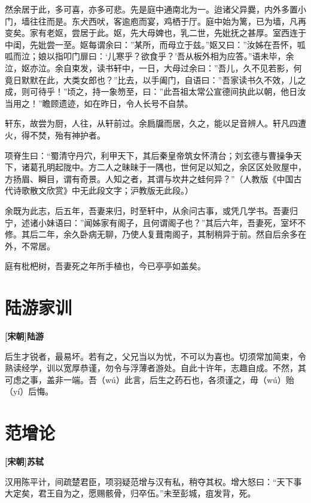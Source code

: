 \documentclass[UTF8,titlepage,oneside]{ctexbook}
\begin{document}
然余居于此，多可喜，亦多可悲。先是庭中通南北为一。迨诸父异爨，内外多置小门，墙往往而是。东犬西吠，客逾庖而宴，鸡栖于厅。庭中始为篱，已为墙，凡再变矣。家有老妪，尝居于此。妪，先大母婢也，乳二世，先妣抚之甚厚。室西连于中闺，先妣尝一至。妪每谓余曰：”某所，而母立于兹。”妪又曰：”汝姊在吾怀，呱呱而泣；娘以指叩门扉曰：‘儿寒乎？欲食乎？’吾从板外相为应答。”语未毕，余泣，妪亦泣。余自束发，读书轩中，一日，大母过余曰：”吾儿，久不见若影，何竟日默默在此，大类女郎也？”比去，以手阖门，自语曰：”吾家读书久不效，儿之成，则可待乎！”顷之，持一象笏至，曰：”此吾祖太常公宣德间执此以朝，他日汝当用之！”瞻顾遗迹，如在昨日，令人长号不自禁。

轩东，故尝为厨，人往，从轩前过。余扃牖而居，久之，能以足音辨人。轩凡四遭火，得不焚，殆有神护者。

项脊生曰：“蜀清守丹穴，利甲天下，其后秦皇帝筑女怀清台；刘玄德与曹操争天下，诸葛孔明起陇中。方二人之昧昧于一隅也，世何足以知之，余区区处败屋中，方扬眉、瞬目，谓有奇景。人知之者，其谓与坎井之蛙何异？”（人教版《中国古代诗歌散文欣赏》中无此段文字；沪教版无此段。）

余既为此志，后五年，吾妻来归，时至轩中，从余问古事，或凭几学书。吾妻归宁，述诸小妹语曰：”闻姊家有阁子，且何谓阁子也？”其后六年，吾妻死，室坏不修。其后二年，余久卧病无聊，乃使人复葺南阁子，其制稍异于前。然自后余多在外，不常居。

庭有枇杷树，吾妻死之年所手植也，今已亭亭如盖矣。


\chapter*{陆游家训}
\begin{center}
	\textbf{[宋朝]陆游}
\end{center}

后生才锐者，最易坏。若有之，父兄当以为忧，不可以为喜也。切须常加简束，令熟读经学，训以宽厚恭谨，勿令与浮薄者游处。自此十许年，志趣自成。不然，其可虑之事，盖非一端。吾（wú）此言，后生之药石也，各须谨之，毋（wú）贻（yí）后悔。



\chapter*{范增论}
\begin{center}
	\textbf{[宋朝]苏轼}
\end{center}

汉用陈平计，间疏楚君臣，项羽疑范增与汉有私，稍夺其权。增大怒曰：“天下事大定矣，君王自为之，愿赐骸骨，归卒伍。”未至彭城，疽发背，死。
\end{document}
